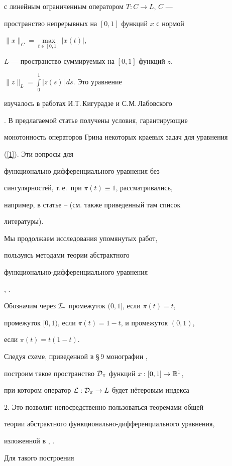 с линейным ограниченным оператором $T:C\to L$, $C$ ---


пространство непрерывных на $[0,1]$ функций $x$ с нормой


$\|x\|_C=\max\limits_{t\in[0,1]}|x(t)|$,


$L$ --- пространство суммируемых на $[0,1]$ функций $z$,


$\|z\|_L=\int\limits_0^1|z(s)|\,ds$. Это уравнение


изучалось в работах И.Т.\,Кигурадзе \cite{Kig} и С.М.\,Лабовского


\cite{Lab}. В предлагаемой статье получены условия, гарантирующие


монотонность операторов Грина некоторых краевых задач для уравнения


(\ref{1}). Эти вопросы для


функционально-дифференциального уравнения без


сингулярностей, т.\,е.~при $\pi(t)\equiv 1$, рассматривались,


например, в статье \cite{AD}--\cite{AD1} (см. также приведенный там список


литературы).


Мы продолжаем исследования упомянутых работ,


пользуясь методами теории абстрактного


функционально-дифференциального уравнения


\cite{FDE}, \cite{AR}.





Обозначим через ${\cal I}_\pi$ промежуток $(0,1]$, если $\pi(t)=t$,


промежуток $[0,1)$, если $\pi(t)=1-t$, и промежуток $(0,1)$,


если $\pi(t)=t(1-t)$.





Следуя схеме, приведенной в \S\,9 монографии \cite{AR},


построим такое пространство ${\cal D}_\pi$ функций $x:[0,1]\to{\Bbb R}^1$,


при котором оператор ${\cal L}:{\cal D}_\pi\to L$ будет н\"етеровым индекса


$2$. Это позволит непосредственно пользоваться теоремами общей


теории абстрактного функционально-дифференциального уравнения,


изложенной в \cite{FDE}, \cite{AR}.


Для такого построения


